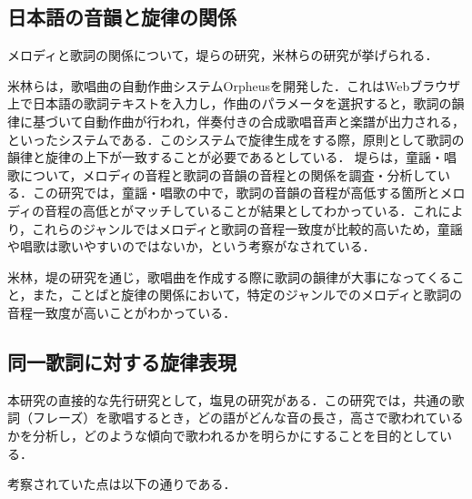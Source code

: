 \subsection{日本語の音韻と旋律の関係}\label{sec:2.2}
メロディと歌詞の関係について，堤らの研究\cite{tutumi}，米林らの研究\cite{orpheus}が挙げられる．\par
米林らは，歌唱曲の自動作曲システムOrpheusを開発した．これはWebブラウザ上で日本語の歌詞テキストを入力し，作曲のパラメータを選択すると，歌詞の韻律に基づいて自動作曲が行われ，伴奏付きの合成歌唱音声と楽譜が出力される，といったシステムである．このシステムで旋律生成をする際，原則として歌詞の韻律と旋律の上下が一致することが必要であるとしている．
堤らは，童謡・唱歌について，メロディの音程と歌詞の音韻の音程との関係を調査・分析している．この研究では，童謡・唱歌の中で，歌詞の音韻の音程が高低する箇所とメロディの音程の高低とがマッチしていることが結果としてわかっている．これにより，これらのジャンルではメロディと歌詞の音程一致度が比較的高いため，童謡や唱歌は歌いやすいのではないか，という考察がなされている．

米林，堤の研究を通じ，歌唱曲を作成する際に歌詞の韻律が大事になってくること，また，ことばと旋律の関係において，特定のジャンルでのメロディと歌詞の音程一致度が高いことがわかっている．

\subsection{同一歌詞に対する旋律表現}\label{sec:2.3}
本研究の直接的な先行研究として，塩見の研究\cite{sikukara}がある．この研究では，共通の歌詞（フレーズ）を歌唱するとき，どの語がどんな音の長さ，高さで歌われているかを分析し，どのような傾向で歌われるかを明らかにすることを目的としている．\par%


考察されていた点は以下の通りである．%


